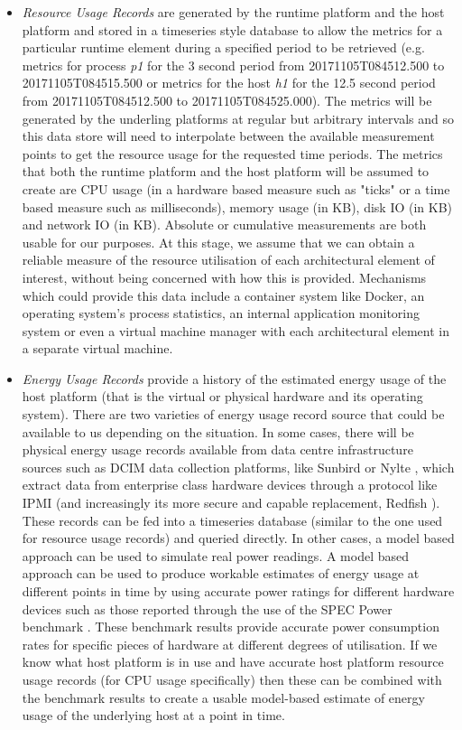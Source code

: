 \begin{itemize}
\item \emph{Resource Usage Records} are generated by the runtime platform and the host platform and stored in a timeseries style database to allow the metrics for a particular runtime element during a specified period to be retrieved (e.g. metrics for process \emph{p1} for the 3 second period from 20171105T084512.500 to 20171105T084515.500 or metrics for the host \emph{h1} for the 12.5 second period from 20171105T084512.500 to 20171105T084525.000).  The metrics will be generated by the underling platforms at regular but arbitrary intervals and so this data store will need to interpolate between the available measurement points to get the resource usage for the requested time periods.  The metrics that both the runtime platform and the host platform will be assumed to create are CPU usage (in a hardware based measure such as "ticks" or a time based measure such as milliseconds), memory usage (in KB), disk IO (in KB) and network IO (in KB).  Absolute or cumulative measurements are both usable for our purposes.  At this stage, we assume that we can obtain a reliable measure of the resource utilisation of each architectural element of interest, without being concerned with how this is provided.  Mechanisms which could provide this data include a container system like Docker, an operating system's process statistics, an internal application monitoring system or even a virtual machine manager with each architectural element in a separate virtual machine.

\item \emph{Energy Usage Records} provide a history of the estimated energy usage of the host platform (that is the virtual or physical hardware and its operating system).  There are two varieties of energy usage record source that could be available to us depending on the situation.  In some cases, there will be physical energy usage records available from data centre infrastructure sources such as DCIM data collection platforms, like Sunbird \cite{sunbird2018} or Nylte \cite{nlyte2018}, which extract data from enterprise class hardware devices through a protocol like IPMI \cite{ipmi2013} (and increasingly its more secure and capable replacement, Redfish \cite{dmtf2018-redfish}).  These records can be fed into a timeseries database (similar to the one used for resource usage records) and queried directly.  In other cases, a model based approach can be used to simulate real power readings.  A model based approach can be used to produce workable estimates of energy usage at different points in time by using accurate power ratings for different hardware devices such as those reported through the use of the SPEC Power benchmark \cite{lange2009-specpower}.  These benchmark results provide accurate power consumption rates for specific pieces of hardware at different degrees of utilisation.  If we know what host platform is in use and have accurate host platform resource usage records (for CPU usage specifically) then these can be combined with the benchmark results to create a usable model-based estimate of energy usage of the underlying host at a point in time.

\end{itemize}

